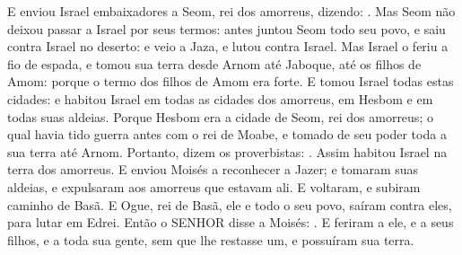 {  E enviou Israel embaixadores a Seom, rei dos amorreus, dizendo:
  .
  Mas Seom não deixou passar a Israel por seus termos: antes juntou Seom todo seu povo, e saiu contra Israel no deserto: e veio a Jaza, e lutou contra Israel.
  Mas Israel o feriu a fio de espada, e tomou sua terra desde Arnom até Jaboque, até os filhos de Amom: porque o termo dos filhos de Amom era forte.
  E tomou Israel todas estas cidades: e habitou Israel em todas as cidades dos amorreus, em Hesbom e em todas suas aldeias.
  Porque Hesbom era a cidade de Seom, rei dos amorreus; o qual havia tido guerra antes com o rei de Moabe, e tomado de seu poder toda a sua terra até Arnom.
  Portanto, dizem os proverbistas: .
  Assim habitou Israel na terra dos amorreus.
  E enviou Moisés a reconhecer a Jazer; e tomaram suas aldeias, e expulsaram aos amorreus que estavam ali.
  E voltaram, e subiram caminho de Basã. E Ogue, rei de Basã, ele e todo o seu povo, saíram contra eles, para lutar em Edrei.
  Então o SENHOR disse a Moisés: . %
  E feriram a ele, e a seus filhos, e a toda sua gente, sem que lhe restasse um, e possuíram sua terra.
\par }

